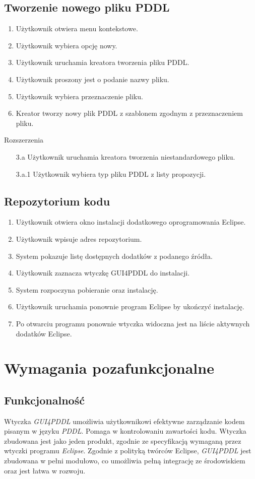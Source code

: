 \subsection{Tworzenie nowego pliku PDDL}
\begin{enumerate}
\item Użytkownik otwiera menu kontekstowe.
\item Użytkownik wybiera opcję nowy.
\item Użytkownik uruchamia kreatora tworzenia pliku PDDL.
\item Użytkownik proszony jest o podanie nazwy pliku.
\item Użytkownik wybiera przeznaczenie pliku.
\item Kreator tworzy nowy plik PDDL z szablonem zgodnym z przeznaczeniem pliku.
\end{enumerate}
Rozszerzenia
\begin{enumerate}
\item[3.a] Użytkownik uruchamia kreatora tworzenia niestandardowego pliku.
\item[3.a.1] Użytkownik wybiera typ pliku PDDL z listy propozycji.
\end{enumerate}
\subsection{Repozytorium kodu}
\begin{enumerate}
\item Użytkownik otwiera okno instalacji dodatkowego oprogramowania Eclipse.
\item Użytkownik wpisuje adres repozytorium.
\item System pokazuje listę dostępnych dodatków z podanego źródła.
\item Użytkownik zaznacza wtyczkę GUI4PDDL do instalacji.
\item System rozpoczyna pobieranie oraz instalację.
\item Użytkownik uruchamia ponownie program Eclipse by ukończyć instalację.
\item Po otwarciu programu ponownie wtyczka widoczna jest na liście aktywnych dodatków Eclipse.
\end{enumerate}
\section{Wymagania pozafunkcjonalne}
\subsection*{Funkcjonalność}
Wtyczka \emph{GUI4PDDL} umożliwia użytkownikowi efektywne zarządzanie kodem pisanym w języku \emph{PDDL}. Pomaga w kontrolowaniu zawartości kodu. Wtyczka zbudowana jest jako jeden produkt, zgodnie ze specyfikacją wymaganą przez wtyczki programu \emph{Eclipse}. Zgodnie z polityką twórców Eclipse, \emph{GUI4PDDL} jest zbudowana w pełni modułowo, co umożliwia pełną integrację ze środowiskiem oraz jest łatwa w rozwoju.
